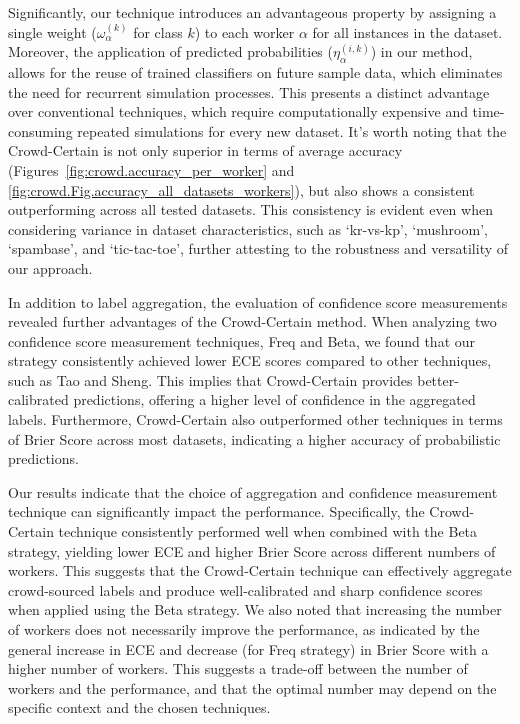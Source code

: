 Significantly, our technique introduces an advantageous property by assigning a single weight ($\omega_{\alpha}^{(k)}$ for class $k$) to each worker $\alpha$ for all instances in the dataset. Moreover, the application of predicted probabilities ($\eta_{\alpha}^{(i,k)}$) in our method, allows for the reuse of trained classifiers on future sample data, which eliminates the need for recurrent simulation processes. This presents a distinct advantage over conventional techniques, which require computationally expensive and time-consuming repeated simulations for every new dataset. It's worth noting that the Crowd-Certain is not only superior in terms of average accuracy (Figures~\ref{fig:crowd.accuracy_per_worker} and \ref{fig:crowd.Fig.accuracy_all_datasets_workers}), but also shows a consistent outperforming across all tested datasets. This consistency is evident even when considering variance in dataset characteristics, such as `kr-vs-kp', `mushroom', `spambase', and `tic-tac-toe', further attesting to the robustness and versatility of our approach.

In addition to label aggregation, the evaluation of confidence score measurements revealed further advantages of the Crowd-Certain method. When analyzing two confidence score measurement techniques, Freq and Beta, we found that our strategy consistently achieved lower ECE scores compared to other techniques, such as Tao and Sheng. This implies that Crowd-Certain provides better-calibrated predictions, offering a higher level of confidence in the aggregated labels. Furthermore, Crowd-Certain also outperformed other techniques in terms of Brier Score across most datasets, indicating a higher accuracy of probabilistic predictions.

Our results indicate that the choice of aggregation and confidence measurement technique can significantly impact the performance. Specifically, the Crowd-Certain technique consistently performed well when combined with the Beta strategy, yielding lower ECE and higher Brier Score across different numbers of workers. This suggests that the Crowd-Certain technique can effectively aggregate crowd-sourced labels and produce well-calibrated and sharp confidence scores when applied using the Beta strategy. We also noted that increasing the number of workers does not necessarily improve the performance, as indicated by the general increase in ECE and decrease (for Freq strategy) in Brier Score with a higher number of workers. This suggests a trade-off between the number of workers and the performance, and that the optimal number may depend on the specific context and the chosen techniques.
%
